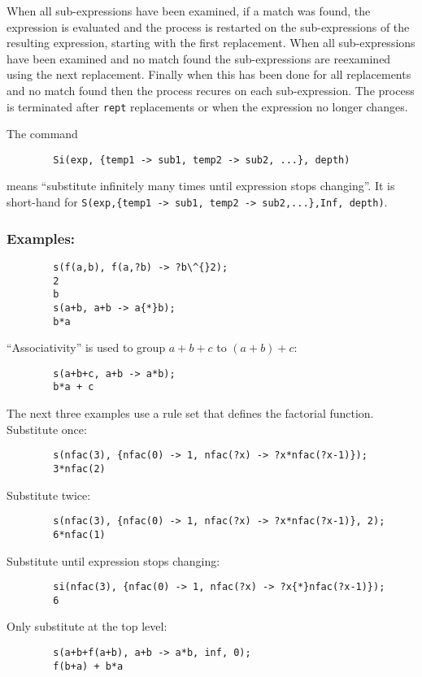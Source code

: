 When all sub-expressions have been examined, if a match was found, the
expression is evaluated and the process is restarted on the sub-expressions of
the resulting expression, starting with the first replacement.  When all
sub-expressions have been examined and no match found the sub-expressions are
reexamined using the next replacement.  Finally when this has been done for all
replacements and no match found then the process recures on each sub-expression.
The process is terminated after \texttt{rept} replacements or when the
expression no longer changes.

The command
\begin{verbatim}
        Si(exp, {temp1 -> sub1, temp2 -> sub2, ...}, depth)
\end{verbatim}
means ``substitute infinitely many times until expression stops changing''.  It
is short-hand for \texttt{S(exp,\{temp1 -> sub1, temp2 -> sub2,...\},Inf, depth)}.


\subsubsection*{Examples:}

\begin{verbatim}
        s(f(a,b), f(a,?b) -> ?b\^{}2);
        2
        b
        s(a+b, a+b -> a{*}b);
        b*a
\end{verbatim}
``Associativity'' is used to group $a+b+c$ to $(a+b)+c$:
\begin{verbatim}
        s(a+b+c, a+b -> a*b);
        b*a + c
\end{verbatim}
The next three examples use a rule set that defines the factorial function.
Substitute once:
\begin{verbatim}
        s(nfac(3), {nfac(0) -> 1, nfac(?x) -> ?x*nfac(?x-1)});
        3*nfac(2)
\end{verbatim}
Substitute twice:
\begin{verbatim}
        s(nfac(3), {nfac(0) -> 1, nfac(?x) -> ?x*nfac(?x-1)}, 2);
        6*nfac(1)
\end{verbatim}
Substitute until expression stops changing:
\begin{verbatim}
        si(nfac(3), {nfac(0) -> 1, nfac(?x) -> ?x{*}nfac(?x-1)});
        6
\end{verbatim}
Only substitute at the top level:
\begin{verbatim}
        s(a+b+f(a+b), a+b -> a*b, inf, 0);
        f(b+a) + b*a
\end{verbatim}



